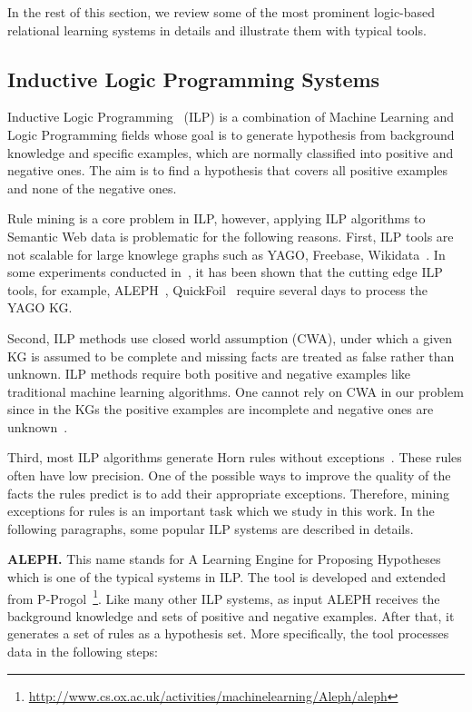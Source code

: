 In the rest of this section, we review some of the most prominent logic-based relational learning systems in details and illustrate them with typical tools.

\subsection{Inductive Logic Programming Systems}

Inductive Logic Programming~\cite{ref9} (ILP) is a combination of Machine Learning and Logic Programming fields whose goal is to generate hypothesis from background knowledge and specific examples, which are normally classified into positive and negative ones. The aim is to find a hypothesis that covers all positive examples and none of the negative ones.

Rule mining is a core problem in ILP, however, applying ILP algorithms to Semantic Web data is problematic for the following reasons. First, ILP tools are not scalable for large knowlege graphs such as YAGO, Freebase, Wikidata~\cite{ref10}. In some experiments conducted in~\cite{ref10}, it has been shown that the cutting edge ILP tools, for example, ALEPH~\cite{ref14, ref10}, QuickFoil~\cite{ref15, ref10} require several days to process the YAGO KG.

Second, ILP methods use closed world assumption (CWA), under which a given KG is assumed to be complete and missing facts are treated as false rather than unknown. ILP methods require both positive and negative examples like traditional machine learning algorithms. One cannot rely on CWA in our problem since in the KGs the positive examples are incomplete and negative ones are unknown~\cite{ref10}.

Third, most ILP algorithms generate Horn rules without exceptions~\cite{ref11}. These rules often have low precision. One of the possible ways to improve the quality of the facts the rules predict is to add their appropriate exceptions. Therefore, mining exceptions for rules is an important task which we study in this work. In the following paragraphs, some popular ILP systems are described in details.

\textbf{ALEPH.} This name stands for A Learning Engine for Proposing Hypotheses which is one of the typical systems in ILP. The tool is developed and extended from P-Progol~\footnote{\url{http://www.cs.ox.ac.uk/activities/machinelearning/Aleph/aleph}}. Like many other ILP systems, as input ALEPH receives the background knowledge and sets of positive and negative examples. After that, it generates a set of rules as a hypothesis set. More specifically, the tool processes data in the following steps:

